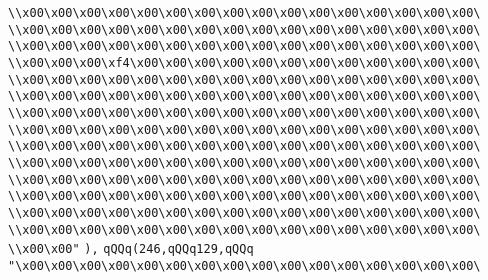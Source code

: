 \verb|\\x00\x00\x00\x00\x00\x00\x00\x00\x00\x00\x00\x00\x00\x00\x00\x00\|\newline
\verb|\\x00\x00\x00\x00\x00\x00\x00\x00\x00\x00\x00\x00\x00\x00\x00\x00\|\newline
\verb|\\x00\x00\x00\x00\x00\x00\x00\x00\x00\x00\x00\x00\x00\x00\x00\x00\|\newline
\verb|\\x00\x00\x00\xf4\x00\x00\x00\x00\x00\x00\x00\x00\x00\x00\x00\x00\|\newline
\verb|\\x00\x00\x00\x00\x00\x00\x00\x00\x00\x00\x00\x00\x00\x00\x00\x00\|\newline
\verb|\\x00\x00\x00\x00\x00\x00\x00\x00\x00\x00\x00\x00\x00\x00\x00\x00\|\newline
\verb|\\x00\x00\x00\x00\x00\x00\x00\x00\x00\x00\x00\x00\x00\x00\x00\x00\|\newline
\verb|\\x00\x00\x00\x00\x00\x00\x00\x00\x00\x00\x00\x00\x00\x00\x00\x00\|\newline
\verb|\\x00\x00\x00\x00\x00\x00\x00\x00\x00\x00\x00\x00\x00\x00\x00\x00\|\newline
\verb|\\x00\x00\x00\x00\x00\x00\x00\x00\x00\x00\x00\x00\x00\x00\x00\x00\|\newline
\verb|\\x00\x00\x00\x00\x00\x00\x00\x00\x00\x00\x00\x00\x00\x00\x00\x00\|\newline
\verb|\\x00\x00\x00\x00\x00\x00\x00\x00\x00\x00\x00\x00\x00\x00\x00\x00\|\newline
\verb|\\x00\x00\x00\x00\x00\x00\x00\x00\x00\x00\x00\x00\x00\x00\x00\x00\|\newline
\verb|\\x00\x00\x00\x00\x00\x00\x00\x00\x00\x00\x00\x00\x00\x00\x00\x00\|\newline
\verb|\\x00\x00"|\newline
\verb|),|\newline
\verb|qQQq(246,qQQq129,qQQq|\newline
\verb|"\x00\x00\x00\x00\x00\x00\x00\x00\x00\x00\x00\x00\x00\x00\x00\x00\|\newline
